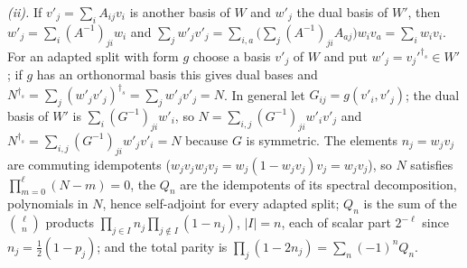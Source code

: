 \emph{(ii).} If $v'_{j} = \sum_{i}A_{ij}v_{i}$ is another basis of $W$ and $w'_{j}$ the dual basis of $W'$, then $w'_{j} = \sum_{i}(A^{-1})_{ji}w_{i}$ and $\sum_{j}w'_{j}v'_{j} = \sum_{i,a}\bigl(\sum_{j}(A^{-1})_{ji}A_{aj}\bigr)w_{i}v_{a} = \sum_{i}w_{i}v_{i}$. For an adapted split with form $g$ choose a basis $v'_{j}$ of $W$ and put $w'_{j} = v_{j}'^{\dagger_{s}} \in W'$; if $g$ has an orthonormal basis this gives dual bases and $N^{\dagger_{s}} = \sum_{j}(w'_{j}v'_{j})^{\dagger_{s}} = \sum_{j}w'_{j}v'_{j} = N$. In general let $G_{ij} = g(v'_{i},v'_{j})$; the dual basis of $W'$ is $\sum_{i}(G^{-1})_{ji}w'_{i}$, so $N = \sum_{i,j}(G^{-1})_{ji}w'_{i}v'_{j}$ and $N^{\dagger_{s}} = \sum_{i,j}(G^{-1})_{ji}w'_{j}v'_{i} = N$ because $G$ is symmetric. The elements $n_{j} = w_{j}v_{j}$ are commuting idempotents ($w_{j}v_{j}w_{j}v_{j} = w_{j}(1 - w_{j}v_{j})v_{j} = w_{j}v_{j}$), so $N$ satisfies $\prod_{m=0}^{\ell}(N - m) = 0$, the $Q_{n}$ are the idempotents of its spectral decomposition, polynomials in $N$, hence self-adjoint for every adapted split; $Q_{n}$ is the sum of the $\binom{\ell}{n}$ products $\prod_{j \in I}n_{j}\prod_{j \notin I}(1 - n_{j})$, $|I| = n$, each of scalar part $2^{-\ell}$ since $n_{j} = \tfrac12(1 - p_{j})$; and the total parity is $\prod_{j}(1 - 2n_{j}) = \sum_{n}(-1)^{n}Q_{n}$.

